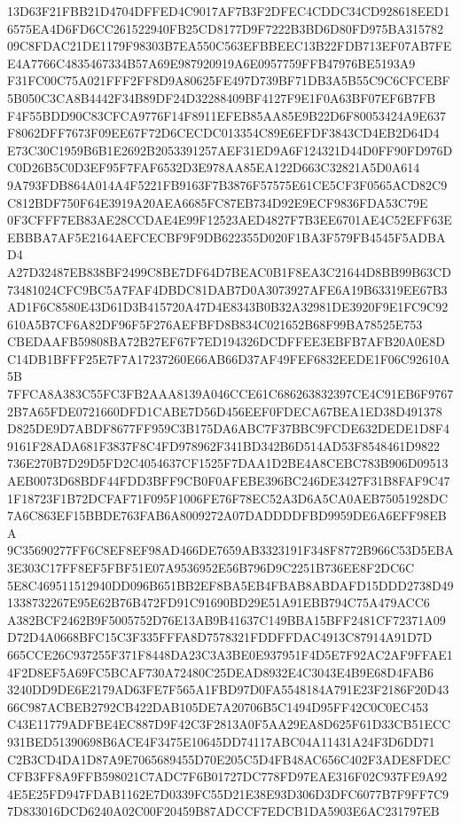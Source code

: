\documentclass[UTF8,fontset=fandol,zihao=-4,a4paper]{ctexart}
\begin{document}
{{13D63F21FBB21D4704DFFED4C9017AF7B3F2DFEC4CDDC34CD928618EED16575EA4D6FD6CC261522940FB25CD8177D9F7222B3BD6D80FD975BA315782
09C8FDAC21DE1179F98303B7EA550C563EFBBEEC13B22FDB713EF07AB7FEE4A7766C4835467334B57A69E987920919A6E0957759FFB47976BE5193A9
F31FC00C75A021FFF2FF8D9A80625FE497D739BF71DB3A5B55C9C6CFCEBF5B050C3CA8B4442F34B89DF24D32288409BF4127F9E1F0A63BF07EF6B7FB
F4F55BDD90C83CFCA9776F14F8911EFEB85AA85E9B22D6F80053424A9E637F8062DFF7673F09EE67F72D6CECDC013354C89E6EFDF3843CD4EB2D64D4
E73C30C1959B6B1E2692B2053391257AEF31ED9A6F124321D44D0FF90FD976DC0D26B5C0D3EF95F7FAF6532D3E978AA85EA122D663C32821A5D0A614
9A793FDB864A014A4F5221FB9163F7B3876F57575E61CE5CF3F0565ACD82C9C812BDF750F64E3919A20AEA6685FC87EB734D92E9ECF9836FDA53C79E
0F3CFFF7EB83AE28CCDAE4E99F12523AED4827F7B3EE6701AE4C52EFF63EEBBBA7AF5E2164AEFCECBF9F9DB622355D020F1BA3F579FB4545F5ADBAD4
A27D32487EB838BF2499C8BE7DF64D7BEAC0B1F8EA3C21644D8BB99B63CD73481024CFC9BC5A7FAF4DBDC81DAB7D0A3073927AFE6A19B63319EE67B3
AD1F6C8580E43D61D3B415720A47D4E8343B0B32A32981DE3920F9E1FC9C92610A5B7CF6A82DF96F5F276AEFBFD8B834C021652B68F99BA78525E753
CBEDAAFB59808BA72B27EF67F7ED194326DCDFFEE3EBFB7AFB20A0E8DC14DB1BFFF25E7F7A17237260E66AB66D37AF49FEF6832EEDE1F06C92610A5B
7FFCA8A383C55FC3FB2AAA8139A046CCE61C686263832397CE4C91EB6F97672B7A65FDE0721660DFD1CABE7D56D456EEF0FDECA67BEA1ED38D491378
D825DE9D7ABDF8677FF959C3B175DA6ABC7F37BBC9FCDE632DEDE1D8F49161F28ADA681F3837F8C4FD978962F341BD342B6D514AD53F8548461D9822
736E270B7D29D5FD2C4054637CF1525F7DAA1D2BE4A8CEBC783B906D09513AEB0073D68BDF44FDD3BFF9CB0F0AFEBE396BC246DE3427F31B8FAF9C47
1F18723F1B72DCFAF71F095F1006FE76F78EC52A3D6A5CA0AEB75051928DC7A6C863EF15BBDE763FAB6A8009272A07DADDDDFBD9959DE6A6EFF98EBA
9C35690277FF6C8EF8EF98AD466DE7659AB3323191F348F8772B966C53D5EBA3E303C17FF8EF5FBF51E07A9536952E56B796D9C2251B736EE8F2DC6C
5E8C469511512940DD096B651BB2EF8BA5EB4FBAB8ABDAFD15DDD2738D491338732267E95E62B76B472FD91C91690BD29E51A91EBB794C75A479ACC6
A382BCF2462B9F5005752D76E13AB9B41637C149BBA15BFF2481CF72371A09D72D4A0668BFC15C3F335FFFA8D7578321FDDFFDAC4913C87914A91D7D
665CCE26C937255F371F8448DA23C3A3BE0E937951F4D5E7F92AC2AF9FFAE14F2D8EF5A69FC5BCAF730A72480C25DEAD8932E4C3043E4B9E68D4FAB6
3240DD9DE6E2179AD63FE7F565A1FBD97D0FA5548184A791E23F2186F20D4366C987ACBEB2792CB422DAB105DE7A20706B5C1494D95FF42C0C0EC453
C43E11779ADFBE4EC887D9F42C3F2813A0F5AA29EA8D625F61D33CB51ECC931BED51390698B6ACE4F3475E10645DD74117ABC04A11431A24F3D6DD71
C2B3CD4DA1D87A9E7065689455D70E205C5D4FB48AC656C402F3ADE8FDECCFB3FF8A9FFB598021C7ADC7F6B01727DC778FD97EAE316F02C937FE9A92
4E5E25FD947FDAB1162E7D0339FC55D21E38E93D306D3DFC6077B7F9FF7C97D833016DCD6240A02C00F20459B87ADCCF7EDCB1DA5903E6AC231797EB
}}
\end{document}
